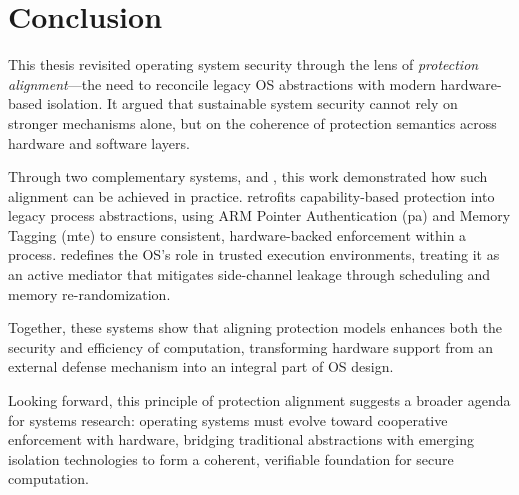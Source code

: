 \chapter{Conclusion}
\label{sec:conclusion}

This thesis revisited operating system security through the lens of \emph{protection alignment}—the need to reconcile legacy OS abstractions with modern hardware-based isolation.
It argued that sustainable system security cannot rely on stronger mechanisms alone, but on the coherence of protection semantics across hardware and software layers.

Through two complementary systems, \capacity and \incognitos, this work demonstrated how such alignment can be achieved in practice.
\capacity retrofits capability-based protection into legacy process abstractions, using ARM Pointer Authentication (\gls{pa}) and Memory Tagging (\gls{mte}) to ensure consistent, hardware-backed enforcement within a process.
\incognitos redefines the OS’s role in trusted execution environments, treating it as an active mediator that mitigates side-channel leakage through scheduling and memory re-randomization.

Together, these systems show that aligning protection models enhances both the security and efficiency of computation, transforming hardware support from an external defense mechanism into an integral part of OS design.

Looking forward, this principle of protection alignment suggests a broader agenda for systems research: operating systems must evolve toward cooperative enforcement with hardware, bridging traditional abstractions with emerging isolation technologies to form a coherent, verifiable foundation for secure computation.
